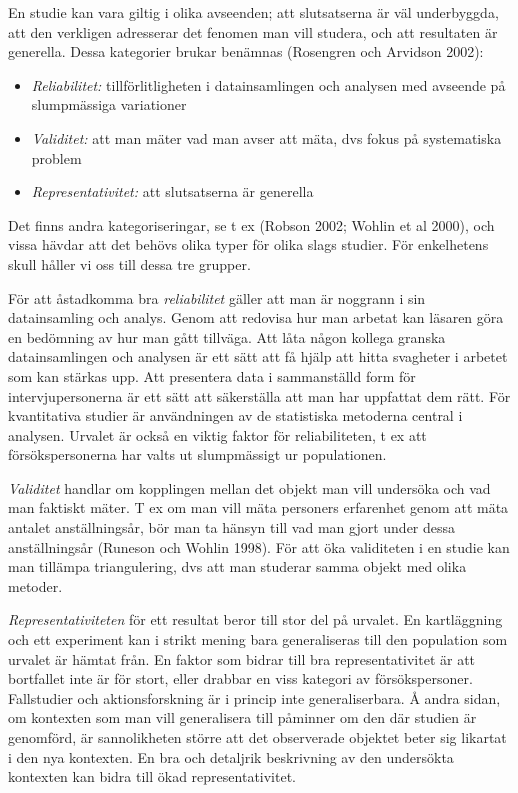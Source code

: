 En studie kan vara giltig i olika avseenden; att slutsatserna är väl
underbyggda, att den verkligen adresserar det fenomen man vill studera,
och att resultaten är generella. Dessa kategorier brukar benämnas
(Rosengren och Arvidson 2002):

\begin{itemize}
\item
  \emph{Reliabilitet:} tillförlitligheten i datainsamlingen och analysen
  med avseende på slumpmässiga variationer
\item
  \emph{Validitet:} att man mäter vad man avser att mäta, dvs fokus på
  systematiska problem
\item
  \emph{Representativitet:} att slutsatserna är generella
\end{itemize}

Det finns andra kategoriseringar, se t ex (Robson 2002; Wohlin et al
2000), och vissa hävdar att det behövs olika typer för olika slags
studier. För enkelhetens skull håller vi oss till dessa tre grupper.

För att åstadkomma bra \emph{reliabilitet} gäller att man är noggrann i
sin datainsamling och analys. Genom att redovisa hur man arbetat kan
läsaren göra en bedömning av hur man gått tillväga. Att låta någon
kollega granska datainsamlingen och analysen är ett sätt att få hjälp
att hitta svagheter i arbetet som kan stärkas upp. Att presentera data i
sammanställd form för intervjupersonerna är ett sätt att säkerställa att
man har uppfattat dem rätt. För kvantitativa studier är användningen av
de statistiska metoderna central i analysen. Urvalet är också en viktig
faktor för reliabiliteten, t ex att försökspersonerna har valts ut
slumpmässigt ur populationen.

\emph{Validitet} handlar om kopplingen mellan det objekt man vill
undersöka och vad man faktiskt mäter. T ex om man vill mäta personers
erfarenhet genom att mäta antalet anställningsår, bör man ta hänsyn till
vad man gjort under dessa anställningsår (Runeson och Wohlin 1998). För
att öka validiteten i en studie kan man tillämpa triangulering, dvs att
man studerar samma objekt med olika metoder.

\emph{Representativiteten} för ett resultat beror till stor del på
urvalet. En kartläggning och ett experiment kan i strikt mening bara
generaliseras till den population som urvalet är hämtat från. En faktor
som bidrar till bra representativitet är att bortfallet inte är för
stort, eller drabbar en viss kategori av försökspersoner. Fallstudier
och aktionsforskning är i princip inte generaliserbara. Å andra sidan,
om kontexten som man vill generalisera till påminner om den där studien
är genomförd, är sannolikheten större att det observerade objektet beter
sig likartat i den nya kontexten. En bra och detaljrik beskrivning av
den undersökta kontexten kan bidra till ökad representativitet.

